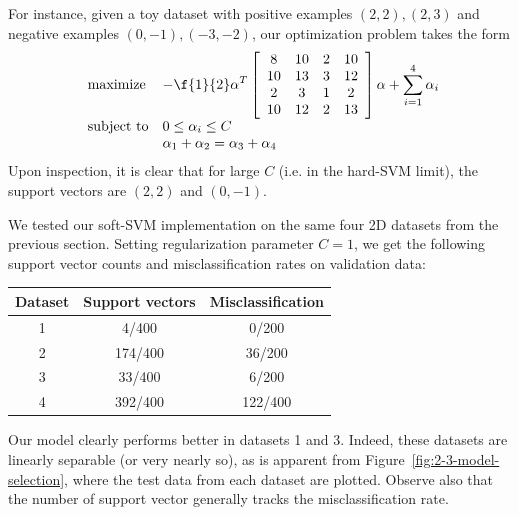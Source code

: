 \documentclass{article}
\begin{document}
\begin{multicols}{2}
For instance, given a toy dataset with positive examples
$(2, 2), (2, 3)$ and negative examples $(0, -1), (-3, -2)$,
our optimization problem takes the form
\begin{equation}
    \label{eq:soft-svm-dual-concrete}
    \begin{array}{ll@{}ll}
        \text{maximize}  &\displaystyle -\f{1}{2}\alpha^T
        \left[
            \begin{array}{cccc}
                8 & 10 & 2 & 10 \\
                10 & 13 & 3 & 12 \\
                2 & 3 & 1 & 2 \\
                10 & 12 & 2 & 13
            \end{array}
        \right]
        \alpha
        +
        \sum_{i=1}^4 \alpha_i \\
        \text{subject to}& 0 \le \alpha_i \le C\\
        & \alpha_1 + \alpha_2 = \alpha_3 + \alpha_4
    \end{array}
\end{equation}
Upon inspection,
it is clear that for large $C$
(i.e. in the hard-SVM limit),
the support vectors are $(2,2)$ and $(0,-1)$.


We tested our soft-SVM implementation
on the same four 2D datasets from the previous section.
Setting regularization parameter $C=1$,
we get the following support vector counts and misclassification rates on validation data:

\begin{center}
\begin{tabular}{|c|c|c|}
\hline
Dataset & Support vectors & Misclassification \\\hline
1 & 4/400 & 0/200 \\
2 & 174/400 & 36/200 \\
3 & 33/400 & 6/200 \\
4 & 392/400 & 122/400\\\hline
\end{tabular}
\end{center}

Our model clearly performs better in datasets 1 and 3.
Indeed, these datasets are linearly separable (or very nearly so),
as is apparent from Figure~\ref{fig:2-3-model-selection},
where the test data from each dataset are plotted.
Observe also that the number of support vector generally tracks the misclassification rate.


\end{multicols}
\end{document}
